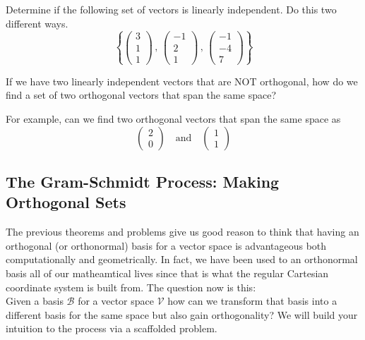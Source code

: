 \begin{problem}
    Determine if the following set of vectors is linearly independent.  Do this two
    different ways.
    \[ \left\{ \begin{pmatrix} 3 \\ 1 \\ 1 \end{pmatrix} \, , \, \begin{pmatrix} -1 \\ 2
            \\ 1
    \end{pmatrix} \, , \, \begin{pmatrix} -1 \\ -4 \\ 7 \end{pmatrix} \right\} \]
\end{problem}







\begin{problem}
    If we have two linearly independent vectors that are NOT orthogonal, how do
    we find a set of two orthogonal vectors that span the same space?

    For example, can we find two orthogonal vectors that span the same space as
    \[ \begin{pmatrix} 2 \\ 0 \end{pmatrix} \quad \text{and} \quad \begin{pmatrix} 1
        \\ 1 \end{pmatrix} \]
\end{problem}

\subsection{The Gram-Schmidt Process: Making Orthogonal Sets}
The previous theorems and problems give us good reason to think that having an orthogonal
(or orthonormal) basis for a vector space is advantageous both computationally and
geometrically.  In fact, we have been used to an orthonormal basis all of our matheamtical
lives since that is what the regular Cartesian coordinate system is built from.  The
question now is this: \\
Given a basis $\mathcal{B}$ for a vector space $\mathcal{V}$ how can we transform that
basis into a different basis for the same space but also gain orthogonality?
We will build your intuition to the process via a scaffolded problem.  

